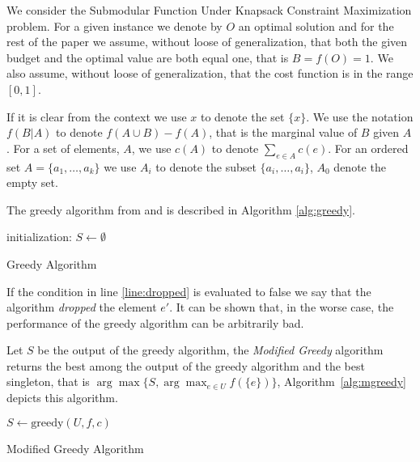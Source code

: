We consider the Submodular Function Under
Knapsack Constraint Maximization problem.
For a given instance we denote by $O$ an optimal solution and for the rest of the 
paper we assume, without loose of generalization, that both the 
given budget and the optimal value are both equal one, that is $B = f(O) = 1$.
We also assume, without loose of generalization, 
that the cost function is in the range $[0, 1]$.
 
If it is clear from the context we use $x$ to denote the set $\{x\}$. 
We use the notation $f(B|A)$ to denote $f(A \cup B) - f(A)$, that is the marginal value of $B$
given $A$. 
For a set of elements, $A$, we use $c(A)$ to denote $\sum_{e \in A}c(e)$.
For an ordered set $A = \{a_1, \dots, a_k\}$ we use $A_i$ to denote the subset 
$\{a_i, \dots, a_i\}$, $A_0$ denote the empty set. 

The greedy algorithm from \cite{khuller1999budgeted} and \cite{krause2005note}
is described in Algorithm \ref{alg:greedy}.

\begin{algorithm}[H]
\label{alg:greedy}



initialization: $S \leftarrow \emptyset$
\\
\caption{Greedy Algorithm}
\end{algorithm}
 
If the condition in line \ref{line:dropped} is evaluated to false we say that the algorithm 
\emph{dropped} the element $e'$.
It can be shown that, in the worse case, the performance of the greedy algorithm 
can be arbitrarily bad.

Let $S$ be the output of the greedy algorithm, the \emph{Modified Greedy} algorithm 
returns the best among the output of the greedy algorithm
and the best singleton, that is $\arg\max\{S, \displaystyle{\arg\max_{e \in U}}f(\{e\})\}$,
Algorithm~\ref{alg:mgreedy} depicts this algorithm.  

\begin{algorithm}[H]
\label{alg:mgreedy}



$S \leftarrow \text{greedy}(U, f, c)$
\\
\caption{Modified Greedy Algorithm}
\end{algorithm}

